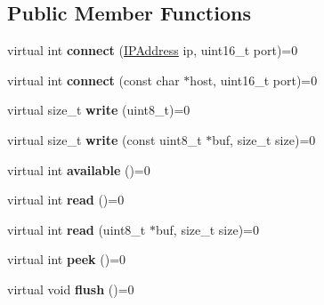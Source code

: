 \subsection*{Public Member Functions}
\begin{DoxyCompactItemize}
\item 
\hypertarget{class_client_adc54fb66dfe79bc1ca8a08151ac39ae2}{}virtual int {\bfseries connect} (\hyperlink{class_i_p_address}{I\+P\+Address} ip, uint16\+\_\+t port)=0\label{class_client_adc54fb66dfe79bc1ca8a08151ac39ae2}

\item 
\hypertarget{class_client_aa859ed2dc24df300b020d5a71af51356}{}virtual int {\bfseries connect} (const char $\ast$host, uint16\+\_\+t port)=0\label{class_client_aa859ed2dc24df300b020d5a71af51356}

\item 
\hypertarget{class_client_afb362c2f297ec232e8750ebe5fda1c8a}{}virtual size\+\_\+t {\bfseries write} (uint8\+\_\+t)=0\label{class_client_afb362c2f297ec232e8750ebe5fda1c8a}

\item 
\hypertarget{class_client_a253996b6d6c563a50e3b2c8265b6e9c6}{}virtual size\+\_\+t {\bfseries write} (const uint8\+\_\+t $\ast$buf, size\+\_\+t size)=0\label{class_client_a253996b6d6c563a50e3b2c8265b6e9c6}

\item 
\hypertarget{class_client_aaab0aa5331d98bdf6d446fbd0cd3648b}{}virtual int {\bfseries available} ()=0\label{class_client_aaab0aa5331d98bdf6d446fbd0cd3648b}

\item 
\hypertarget{class_client_a79a0b69fcee98478f989c54c25a129b4}{}virtual int {\bfseries read} ()=0\label{class_client_a79a0b69fcee98478f989c54c25a129b4}

\item 
\hypertarget{class_client_a11a2d1b2145412f6d606817d1f3b09b7}{}virtual int {\bfseries read} (uint8\+\_\+t $\ast$buf, size\+\_\+t size)=0\label{class_client_a11a2d1b2145412f6d606817d1f3b09b7}

\item 
\hypertarget{class_client_a86998d50e0b5e0f8957dd1025fb49046}{}virtual int {\bfseries peek} ()=0\label{class_client_a86998d50e0b5e0f8957dd1025fb49046}

\item 
\hypertarget{class_client_a2ddbd7aa6b5d18e1e463c359b22829aa}{}virtual void {\bfseries flush} ()=0\label{class_client_a2ddbd7aa6b5d18e1e463c359b22829aa}


\end{DoxyCompactItemize}

